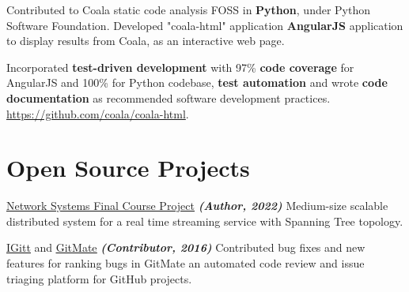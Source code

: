 \documentclass[]{deedy-resume-openfont}
\begin{document}
\begin{minipage}[t]{0.66\textwidth}
\begin{tightemize}     
\item Contributed to Coala \textemdash static code analysis FOSS \textemdash in \textbf{Python}, under Python Software Foundation. Developed "coala-html" application \textemdash \textbf{AngularJS} application to display results from Coala, as an interactive web page.
\item Incorporated \textbf{test-driven development} with 97\%    \textbf{code coverage} for AngularJS and 100\% for Python codebase, \textbf{test automation} and wrote \textbf{code documentation} as recommended software development practices. \href{https://github.com/coala/coala-html}{https://github.com/coala/coala-html}.
\end{tightemize}
\sectionsep

\section{Open Source Projects}
\vspace{\topsep}
\begin{tightemize}
    \item \href{https://github.com/tushar-rishav/CSCI5273_Final_Project}{\underline {Network Systems Final Course Project}} {\footnotesize \textit{\textbf{(Author, 2022) }}} Medium-size scalable distributed system for a real time streaming service with Spanning Tree topology.
    \item \href{https://gitlab.com/gitmate/open-source/IGitt}{\underline {IGitt}} and \href{https://gitlab.com/gitmate/open-source/gitmate-2}{\underline {GitMate}} {\footnotesize \textit{\textbf{(Contributor, 2016) }}} \textemdash Contributed bug fixes and new features for ranking bugs in GitMate \textemdash an automated code review and issue triaging platform for GitHub projects. \\

\end{tightemize}
\sectionsep

\end{minipage} 
\end{document}
